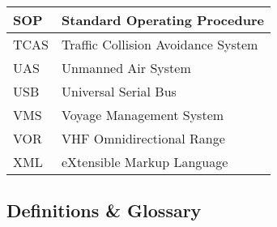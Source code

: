 \begin{longtable}{|L{}|L{}|}
  SOP & Standard Operating Procedure\\\hline
	TCAS & Traffic Collision Avoidance System\\\hline
	UAS & Unmanned Air System\\\hline
	USB & Universal Serial Bus\\\hline
  VMS & Voyage Management System\\\hline
  VOR & VHF Omnidirectional Range\\\hline
  XML & eXtensible Markup Language\\\hline
\end{longtable}

\clearpage %
\subsection{Definitions \& Glossary}
